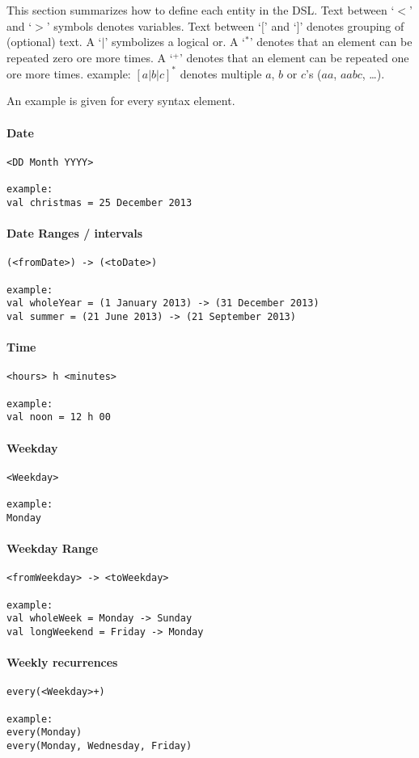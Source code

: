 This section summarizes how to define each entity in the DSL.
Text between `$<$' and `$>$' symbols denotes variables.
Text between `$[$' and `$]$' denotes grouping of (optional) text.
A `$|$' symbolizes a logical or.
A `$^*$' denotes that an element can be repeated zero ore more times.
A `$^+$' denotes that an element can be repeated one ore more times.
example: $[a|b|c]^*$ denotes multiple $a$, $b$ or $c$'s ($aa$, $aabc$, \dots).

An example is given for every syntax element.

\newcommand{\elem}[1]{\vspace{-1.5em}\paragraph{#1}\hfill}

\elem{Date}
\begin{lstlisting}
<DD Month YYYY>

example:
val christmas = 25 December 2013
\end{lstlisting}

\elem{Date Ranges / intervals}
\begin{lstlisting}
(<fromDate>) -> (<toDate>)

example:
val wholeYear = (1 January 2013) -> (31 December 2013)
val summer = (21 June 2013) -> (21 September 2013)
\end{lstlisting}

\elem{Time}
\begin{lstlisting}
<hours> h <minutes>

example:
val noon = 12 h 00
\end{lstlisting}

\elem{Weekday}
\begin{lstlisting}
<Weekday>

example:
Monday
\end{lstlisting}

\elem{Weekday Range}
\begin{lstlisting}
<fromWeekday> -> <toWeekday>

example:
val wholeWeek = Monday -> Sunday
val longWeekend = Friday -> Monday
\end{lstlisting}
\clearpage

\elem{Weekly recurrences}
\begin{lstlisting}
every(<Weekday>+)

example:
every(Monday)
every(Monday, Wednesday, Friday)
\end{lstlisting}

